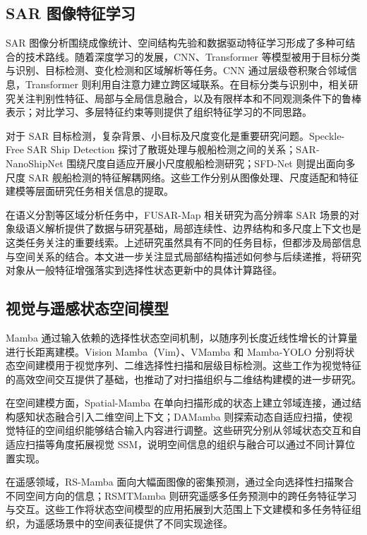 \documentclass[journal]{IEEEtran}
\begin{document}
\subsection{SAR 图像特征学习}

SAR 图像分析围绕成像统计、空间结构先验和数据驱动特征学习形成了多种可结合的技术路线。随着深度学习的发展，CNN、Transformer 等模型被用于目标分类与识别、目标检测、变化检测和区域解析等任务。CNN 通过层级卷积聚合邻域信息，Transformer 则利用自注意力建立跨区域联系\cite{resnet2015,vit2020}。在目标分类与识别中，相关研究关注判别性特征、局部与全局信息融合，以及有限样本和不同观测条件下的鲁棒表示；对比学习、多层特征约束等则提供了组织特征学习的不同思路。

对于 SAR 目标检测，复杂背景、小目标及尺度变化是重要研究问题。Speckle-Free SAR Ship Detection 探讨了散斑处理与舰船检测之间的关系\cite{specklefree}；SAR-NanoShipNet 围绕尺度自适应开展小尺度舰船检测研究\cite{sarnano}；SFD-Net 则提出面向多尺度 SAR 舰船检测的特征解耦网络\cite{sfdnet}。这些工作分别从图像处理、尺度适配和特征建模等层面研究任务相关信息的提取。

在语义分割等区域分析任务中，FUSAR-Map 相关研究为高分辨率 SAR 场景的对象级语义解析提供了数据与研究基础\cite{fusar}，局部连续性、边界结构和多尺度上下文也是这类任务关注的重要线索。上述研究虽然具有不同的任务目标，但都涉及局部信息与空间关系的结合。本文进一步关注显式局部结构描述如何参与后续递推，将研究对象从一般特征增强落实到选择性状态更新中的具体计算路径。

\subsection{视觉与遥感状态空间模型}

Mamba 通过输入依赖的选择性状态空间机制，以随序列长度近线性增长的计算量进行长距离建模\cite{mamba2023}。Vision Mamba（Vim）、VMamba 和 Mamba-YOLO 分别将状态空间建模用于视觉序列、二维选择性扫描和层级目标检测\cite{vim2024,vmamba2024,mambayolo2024}。这些工作为视觉特征的高效空间交互提供了基础，也推动了对扫描组织与二维结构建模的进一步研究。

在空间建模方面，Spatial-Mamba 在单向扫描形成的状态上建立邻域连接，通过结构感知状态融合引入二维空间上下文\cite{spatialmamba2025}；DAMamba 则探索动态自适应扫描，使视觉特征的空间组织能够结合输入内容进行调整\cite{damamba2025}。这些研究分别从邻域状态交互和自适应扫描等角度拓展视觉 SSM，说明空间信息的组织与融合可以通过不同计算位置实现。

在遥感领域，RS-Mamba 面向大幅面图像的密集预测，通过全向选择性扫描聚合不同空间方向的信息\cite{rsmamba2024}；RSMTMamba 则研究遥感多任务预测中的跨任务特征学习与交互\cite{rstmtmamba2025}。这些工作将状态空间模型的应用拓展到大范围上下文建模和多任务特征组织，为遥感场景中的空间表征提供了不同实现途径。
\end{document}
